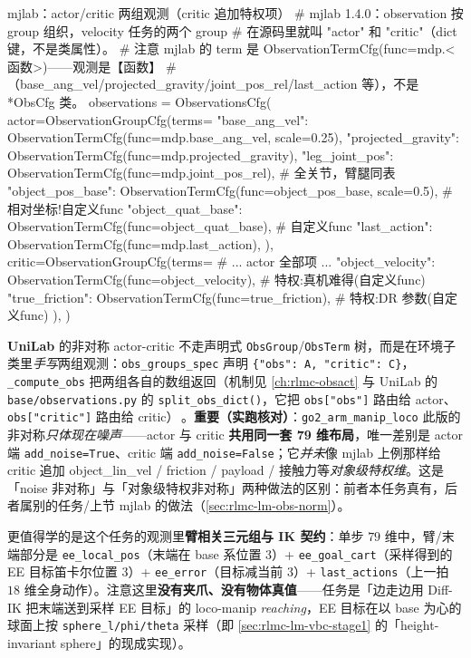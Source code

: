 \begin{codebox}[Python]{mjlab：actor/critic 两组观测（critic 追加特权项）}
# mjlab 1.4.0：observation 按 group 组织，velocity 任务的两个 group
#   在源码里就叫 "actor" 和 "critic"（dict 键，不是类属性）。
# 注意 mjlab 的 term 是 ObservationTermCfg(func=mdp.<函数>)——观测是【函数】
#   （base_ang_vel/projected_gravity/joint_pos_rel/last_action 等），不是 *ObsCfg 类。
observations = ObservationsCfg(
    actor=ObservationGroupCfg(terms={
        "base_ang_vel": ObservationTermCfg(func=mdp.base_ang_vel, scale=0.25),
        "projected_gravity": ObservationTermCfg(func=mdp.projected_gravity),
        "leg_joint_pos": ObservationTermCfg(func=mdp.joint_pos_rel),  # 全关节，臂腿同表
        "object_pos_base": ObservationTermCfg(func=object_pos_base, scale=0.5),  # 相对坐标!自定义func
        "object_quat_base": ObservationTermCfg(func=object_quat_base),           # 自定义func
        "last_action": ObservationTermCfg(func=mdp.last_action),
    }),
    critic=ObservationGroupCfg(terms={
        # ... actor 全部项 ...
        "object_velocity": ObservationTermCfg(func=object_velocity),  # 特权:真机难得(自定义func)
        "true_friction": ObservationTermCfg(func=true_friction),      # 特权:DR 参数(自定义func)
    }),
)
\end{codebox}

\textbf{UniLab} 的非对称 actor-critic 不走声明式 \verb|ObsGroup|/\verb|ObsTerm| 树，而是在环境子类里\emph{手写}两组观测：\verb|obs_groups_spec| 声明 \verb|{"obs": A, "critic": C}|，\verb|_compute_obs| 把两组各自的数组返回（机制见 \cref{ch:rlmc-obsact} 与 UniLab 的 \verb|base/observations.py| 的 \verb|split_obs_dict()|，它把 \verb|obs["obs"]| 路由给 actor、\verb|obs["critic"]| 路由给 critic）\,\cite{unilab2026}。\textbf{重要（实跑核对）}：\verb|go2_arm_manip_loco| 此版的非对称\emph{只体现在噪声}——actor 与 critic \textbf{共用同一套 79 维布局}，唯一差别是 actor 端 \verb|add_noise=True|、critic 端 \verb|add_noise=False|；它\emph{并未}像 mjlab 上例那样给 critic 追加 object\_lin\_vel / friction / payload / 接触力等\emph{对象级特权维}。这是「noise 非对称」与「对象级特权非对称」两种做法的区别：前者本任务真有，后者属别的任务/上节 mjlab 的做法（\cref{sec:rlmc-lm-obs-norm}）。

更值得学的是这个任务的观测里\textbf{臂相关三元组与 IK 契约}：单步 $79$ 维中，臂/末端部分是 \verb|ee_local_pos|（末端在 base 系位置 $3$）+ \verb|ee_goal_cart|（采样得到的 EE 目标笛卡尔位置 $3$）+ \verb|ee_error|（目标减当前 $3$）+ \verb|last_actions|（上一拍 $18$ 维全身动作）。注意这里\textbf{没有夹爪、没有物体真值}——任务是「边走边用 Diff-IK 把末端送到采样 EE 目标」的 loco-manip \emph{reaching}，EE 目标在以 base 为心的球面上按 \verb|sphere_l/phi/theta| 采样（即 \cref{sec:rlmc-lm-vbc-stage1} 的「height-invariant sphere」的现成实现）。

